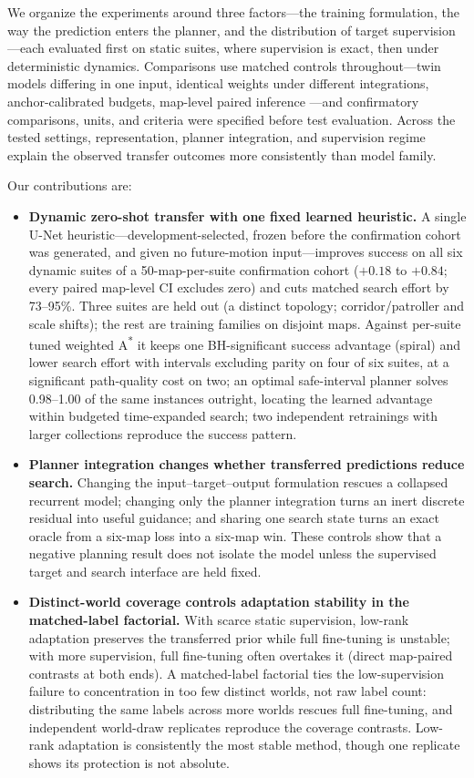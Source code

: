\documentclass[letterpaper]{article} %
\begin{document}
We organize the experiments around three factors---the training formulation, the way the prediction enters the planner, and the distribution of target supervision---each evaluated first on static suites, where supervision is exact, then under deterministic dynamics. Comparisons use matched controls throughout---twin models differing in one input, identical weights under different integrations, anchor-calibrated budgets, map-level paired inference \citep{henderson2018matters,agarwal2021precipice,pineau2021reproducibility}---and confirmatory comparisons, units, and criteria were specified before test evaluation. Across the tested settings, representation, planner integration, and supervision regime explain the observed transfer outcomes more consistently than model family.

Our contributions are:
\begin{itemize}
    \item \textbf{Dynamic zero-shot transfer with one fixed learned heuristic.} A single U-Net heuristic---development-selected, frozen before the confirmation cohort was generated, and given no future-motion input---improves success on all six dynamic suites of a 50-map-per-suite confirmation cohort ($+0.18$ to $+0.84$; every paired map-level CI excludes zero) and cuts matched search effort by 73--95\%. Three suites are held out (a distinct topology; corridor/patroller and scale shifts); the rest are training families on disjoint maps. Against per-suite tuned weighted A\textsuperscript{*} it keeps one BH-significant success advantage (spiral) and lower search effort with intervals excluding parity on four of six suites, at a significant path-quality cost on two; an optimal safe-interval planner solves 0.98--1.00 of the same instances outright, locating the learned advantage within budgeted time-expanded search; two independent retrainings with larger collections reproduce the success pattern.
    \item \textbf{Planner integration changes whether transferred predictions reduce search.} Changing the input--target--output formulation rescues a collapsed recurrent model; changing only the planner integration turns an inert discrete residual into useful guidance; and sharing one search state turns an exact oracle from a six-map loss into a six-map win. These controls show that a negative planning result does not isolate the model unless the supervised target and search interface are held fixed.
    \item \textbf{Distinct-world coverage controls adaptation stability in the matched-label factorial.} With scarce static supervision, low-rank adaptation preserves the transferred prior while full fine-tuning is unstable; with more supervision, full fine-tuning often overtakes it (direct map-paired contrasts at both ends). A matched-label factorial ties the low-supervision failure to concentration in too few distinct worlds, not raw label count: distributing the same labels across more worlds rescues full fine-tuning, and independent world-draw replicates reproduce the coverage contrasts. Low-rank adaptation is consistently the most stable method, though one replicate shows its protection is not absolute.
\end{itemize}
\end{document}

